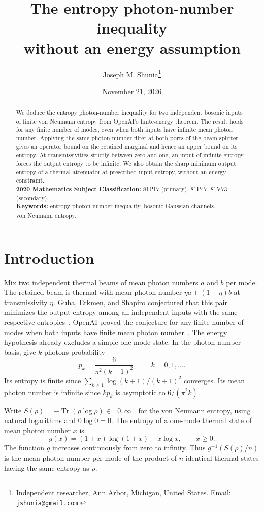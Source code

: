 \documentclass[11pt,letterpaper]{article}
\title{\vspace{-1.5\baselineskip}%
  The entropy photon-number inequality\\without an energy assumption}
\author{Joseph M. Shunia\thanks{Independent researcher, Ann Arbor, Michigan, United States.
  Email: \href{mailto:jshunia@gmail.com}{\texttt{jshunia@gmail.com}}.}}
\date{November 21, 2026}
\numberwithin{equation}{section}
\DeclareMathOperator{\Tr}{Tr}
\begin{document}
\maketitle
\vspace{-\baselineskip}

\begin{abstract}
We deduce the entropy photon-number inequality for two independent
bosonic inputs of finite von Neumann entropy from OpenAI's finite-energy
theorem. The result holds for any finite number of modes, even when
both inputs have infinite mean photon number. Applying the
same photon-number filter at both ports of the beam splitter gives an
operator bound on the retained marginal and hence an upper bound on its
entropy. At transmissivities strictly between zero and one, an input of
infinite entropy forces the output entropy to be infinite. We also
obtain the sharp minimum output entropy of a thermal attenuator at
prescribed input entropy, without an energy constraint.
\\[2mm]
{\bf 2020 Mathematics Subject Classification:} 81P17 (primary), 81P47, 81V73 (secondary).
\\[2mm]
{\bf Keywords:} entropy photon-number inequality, bosonic Gaussian channels,\\
von Neumann entropy.
\end{abstract}

\section{Introduction}

Mix two independent thermal beams of mean photon numbers $a$ and $b$
per mode. The retained beam is thermal with mean photon number
$\eta a+(1-\eta)b$ at transmissivity $\eta$. Guha, Erkmen, and
Shapiro conjectured that this pair minimizes the output entropy among
all independent inputs with the same respective entropies~\cite{ges}.
OpenAI proved the conjecture for any finite number of modes when both
inputs have finite mean photon number~\cite[Theorem~1.1]{oai}.
The energy hypothesis already excludes a simple one-mode state. In the
photon-number basis, give $k$ photons probability
\[
 p_k=\frac{6}{\pi^2(k+1)^2},\qquad k=0,1,\ldots.
\]
Its entropy is finite since $\sum_{k\ge1}\log(k+1)/(k+1)^2$ converges.
Its mean photon number is infinite since $k p_k$ is asymptotic to
$6/(\pi^2 k)$.

Write $S(\rho)=-\Tr(\rho\log\rho)\in[0,\infty]$ for the von Neumann
entropy, using natural logarithms and $0\log 0=0$. The entropy of a
one-mode thermal state of mean photon number $x$ is
\[
 g(x)=(1+x)\log(1+x)-x\log x,\qquad x\ge0.
\]
The function $g$ increases continuously from zero to infinity. Thus
$g^{-1}(S(\rho)/n)$ is the mean photon number per mode of the product
of $n$ identical thermal states having the same entropy as $\rho$.
\end{document}
